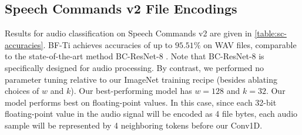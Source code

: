 \begin{table}

\centering
{}
\caption{
  Results for audio classification with BF-Ti on the Speech Commands v2 dataset. ``W-'' denotes WAV files with the given bit width. $\mathbb{E}[S]$ denotes the shape of network inputs.
}
\label{table:sc-accuracies}
\end{table}


\subsection{Speech Commands v2 File Encodings}
Results for audio classification on Speech Commands v2 \cite{speechcommands} are given in \autoref{table:sc-accuracies}. BF-Ti achieves accuracies of up to $95.51\%$ on WAV files, comparable to the state-of-the-art method BC-ResNet-8 \cite{bcresnet}. Note that BC-ResNet-8 is specifically designed for audio processing. By contrast, we performed no parameter tuning relative to our ImageNet training recipe (besides ablating choices of $w$ and $k$). Our best-performing model has $w=128$ and $k=32$. Our model performs best on floating-point values. In this case, since each 32-bit floating-point value in the audio signal will be encoded as 4 file bytes, each audio sample will be represented by 4 neighboring tokens before our Conv1D.


